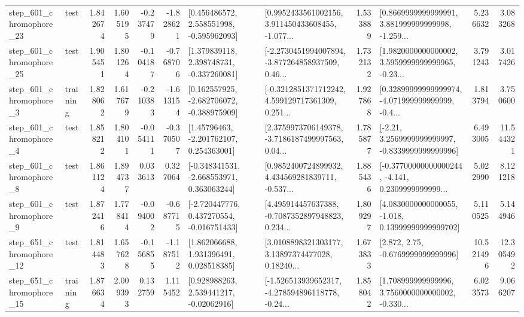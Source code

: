 \begin{tabular}{llrrrrllrlrr}
  step\_601\_chromophore\_23 &      test &      1.842674 &    1.605195 &     -0.237479 & -1.828621 &    [0.456486572, 2.558551998, -0.595962093] &  [0.9952433561002156, 3.911450433608455, -1.077... &       1.533889 &  [0.8669999999999991, 3.881999999999998, -1.259... &            5.236632 &          3.083268 \\
  step\_601\_chromophore\_25 &      test &      1.905451 &    1.801264 &     -0.104187 & -0.768706 &    [1.379839118, 2.398748731, -0.337260081] &  [-2.2730451994007894, -3.877264858937509, 0.46... &       1.732132 &  [1.9820000000000002, 3.5959999999999965, -0.23... &            3.791243 &          3.017426 \\
   step\_601\_chromophore\_3 &  training &      1.828062 &    1.617679 &     -0.210383 & -1.613154 &   [0.162557925, -2.682706072, -0.388975909] &  [-0.3212851371712242, 4.599129717361309, 0.251... &       1.927868 &  [0.32899999999999974, -4.071999999999999, -0.4... &            1.813794 &          3.750600 \\
   step\_601\_chromophore\_4 &      test &      1.858212 &    1.804101 &     -0.054111 & -0.370507 &     [1.45796463, -2.201762107, 0.254363001] &  [2.3759973706149378, -3.7186187499997563, 0.04... &       1.785877 &   [-2.21, 3.2569999999999997, -0.8339999999999996] &            6.493005 &         11.544321 \\
   step\_601\_chromophore\_8 &      test &      1.861124 &    1.894737 &      0.033613 &  0.327064 &   [-0.348341531, -2.668553971, 0.363063244] &  [0.9852400724899932, 4.434569281839711, -0.537... &       1.885436 &  [-0.37700000000000244, -4.141, 0.2309999999999... &            5.022990 &          8.121218 \\
   step\_601\_chromophore\_9 &      test &      1.872416 &    1.778414 &     -0.094002 & -0.687715 &   [-2.720447776, 0.437270554, -0.016751433] &  [4.495914457637388, -0.7087352897948823, 0.234... &       1.809297 &  [4.0830000000000055, -1.018, 0.13999999999999702] &            5.110525 &          5.144946 \\
  step\_651\_chromophore\_12 &      test &      1.814483 &    1.657628 &     -0.156855 & -1.187512 &     [1.862066688, 1.931396491, 0.028518385] &  [3.0108898321303177, 3.13897374477028, 0.18240... &       1.673833 &                 [2.872, 2.75, -0.6769999999999996] &           10.521496 &         12.305492 \\
  step\_651\_chromophore\_15 &  training &      1.876634 &    2.009393 &      0.132759 &  1.115452 &     [0.928988263, 2.539441217, -0.02062916] &  [-1.526513939652317, -4.278594896118778, -0.24... &       1.858042 &  [1.708999999999996, 3.7560000000000002, -0.330... &            6.023573 &          9.066207 \\

\end{tabular}
